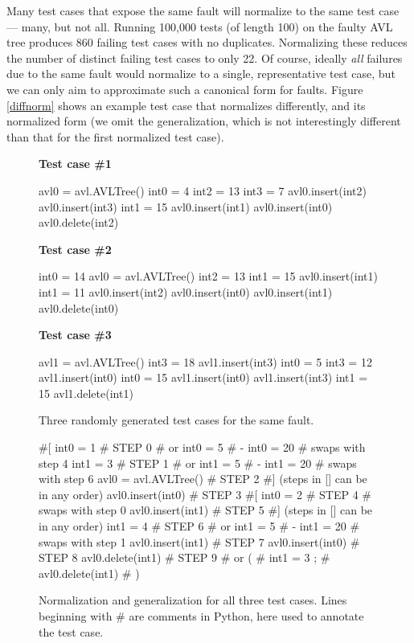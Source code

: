 Many test cases that expose the same fault will normalize to the same
test case --- many, but not all.  Running 100,000 tests (of length
100) on the faulty AVL tree produces 860 failing test cases with no
duplicates.  Normalizing these reduces the number of distinct failing
test cases to only 22.  Of course, ideally \emph{all} failures due to the same fault
would normalize to a single, representative test case, but we can only
aim to approximate such a canonical form for faults.  Figure
\ref{diffnorm} shows an example test case that normalizes differently,
and its normalized form (we omit the generalization, which is not
interestingly different than that for the first normalized test case).

\begin{figure}
{\scriptsize
{\bf Test case \#1}
\begin{code}
avl0 = avl.AVLTree() 
int0 = 4 
int2 = 13 
int3 = 7 
avl0.insert(int2) 
avl0.insert(int3) 
int1 = 15 
avl0.insert(int1) 
avl0.insert(int0) 
avl0.delete(int2)
\end{code}
{\bf Test case \#2}
\begin{code}
int0 = 14 
avl0 = avl.AVLTree() 
int2 = 13 
int1 = 15 
avl0.insert(int1) 
int1 = 11 
avl0.insert(int2) 
avl0.insert(int0) 
avl0.insert(int1) 
avl0.delete(int0) 
\end{code}
{\bf Test case \#3}
\begin{code}
avl1 = avl.AVLTree() 
int3 = 18 
avl1.insert(int3) 
int0 = 5 
int3 = 12 
avl1.insert(int0) 
int0 = 15 
avl1.insert(int0) 
avl1.insert(int3) 
int1 = 15 
avl1.delete(int1) 
\end{code}
}
\caption {Three randomly generated test cases for the same fault.}
\label{threetests}
\end{figure}

\begin{figure}
{\scriptsize
\begin{code}
\#[
int0 = 1                       \# STEP 0
\#  or int0 = 5 
\#   - int0 = 20 
\#  swaps with step 4
int1 = 3                       \# STEP 1
\#  or int1 = 5 
\#   - int1 = 20 
\#  swaps with step 6
avl0 = avl.AVLTree()           \# STEP 2
\#] (steps in [] can be in any order)
avl0.insert(int0)              \# STEP 3
\#[
int0 = 2                       \# STEP 4
\#  swaps with step 0
avl0.insert(int1)              \# STEP 5
\#] (steps in [] can be in any order)
int1 = 4                       \# STEP 6
\#  or int1 = 5 
\#   - int1 = 20 
\#  swaps with step 1
avl0.insert(int1)              \# STEP 7
avl0.insert(int0)              \# STEP 8
avl0.delete(int1)              \# STEP 9
\#  or (
\#      int1 = 3  ;
\#      avl0.delete(int1) 
\#     )
\end{code}
}
\caption{Normalization and generalization for all three test cases.
  Lines beginning with \# are comments in Python, here used to
annotate the test case.}
\label{normalgen}
\end{figure}


